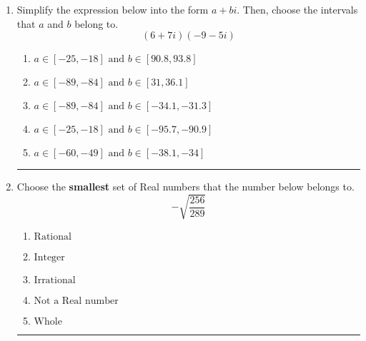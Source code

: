 \documentclass[14pt]{extbook}
\newcommand{\litem}[1]{\item#1\hspace*{-1cm}\rule{\textwidth}{0.4pt}}
\begin{document}
\begin{enumerate}
{\begin{enumerate}[label=\Alph*.]
\end{enumerate} }
\litem{
Simplify the expression below into the form $a+bi$. Then, choose the intervals that $a$ and $b$ belong to.\[ (6 + 7 i)(-9 - 5 i) \]\begin{enumerate}[label=\Alph*.]
\item \( a \in [-25, -18] \text{ and } b \in [90.8, 93.8] \)
\item \( a \in [-89, -84] \text{ and } b \in [31, 36.1] \)
\item \( a \in [-89, -84] \text{ and } b \in [-34.1, -31.3] \)
\item \( a \in [-25, -18] \text{ and } b \in [-95.7, -90.9] \)
\item \( a \in [-60, -49] \text{ and } b \in [-38.1, -34] \)

\end{enumerate} }
\litem{
Choose the \textbf{smallest} set of Real numbers that the number below belongs to.\[ -\sqrt{\frac{256}{289}} \]\begin{enumerate}[label=\Alph*.]
\item \( \text{Rational} \)
\item \( \text{Integer} \)
\item \( \text{Irrational} \)
\item \( \text{Not a Real number} \)
\item \( \text{Whole} \)

\end{enumerate} }
\end{enumerate}
\end{document}
